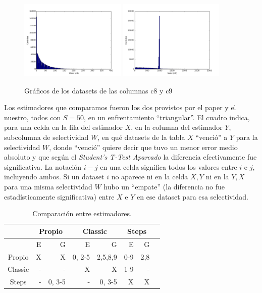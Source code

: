  
\begin{figure}[h!]
  \centering
  \includegraphics[width=0.45\textwidth]{./../source/datasets/img/c8}
  \includegraphics[width=0.45\textwidth]{./../source/datasets/img/c9}
  \caption{Gráficos de los datasets de las columnas c8 y c9}
 \end{figure}
 
\clearpage
Los estimadores que comparamos fueron los dos provistos por el paper y el nuestro, todos con $S=50$, en un enfrentamiento ``triangular''.
El cuadro indica, para una celda en la fila del estimador $X$, en la columna del estimador $Y$, subcolumna de selectividad $W$, en qué datasets de la tabla $X$ ``venció'' a $Y$ para la selectividad $W$, donde ``venció'' quiere decir que tuvo un menor error medio absoluto y que según el \textit{Student’s T-Test Apareado} la diferencia efectivamente fue significativa. La notación $i-j$ en una celda significa todos los valores entre $i$ e $j$, incluyendo ambos. Si un dataset $i$ no aparece ni en la celda $X, Y$ ni en la $Y, X$ para una misma selectividad $W$ hubo un ``empate'' (la diferencia no fue estadísticamente significativa) entre $X$ e $Y$ en ese dataset para esa selectividad.

\begin{table}[h!t]
\centering %
\begin{tabular}{c rrrrrrr} %
\hline\hline %
\ &\multicolumn{2}{c}{Propio}& \multicolumn{2}{c}{Classic}& \multicolumn{2}{c}{Steps} \\ [0.5ex] 
\hline %
 & E & G & E & G & E & G &  \\  
\hline
Propio &X  &X  &0, 2-5&2,5,8,9&0-9 &2,8 \\ %
\hline
Classic &-  &-  &X &X &1-9 &- \\
\hline
Steps &-  &0, 3-5 &- &0, 3-5 &X &X  \\[1ex] %
\hline %
\end{tabular}
\caption{Comparación entre estimadores.} %
\label{tab:hresult}
\end{table}

